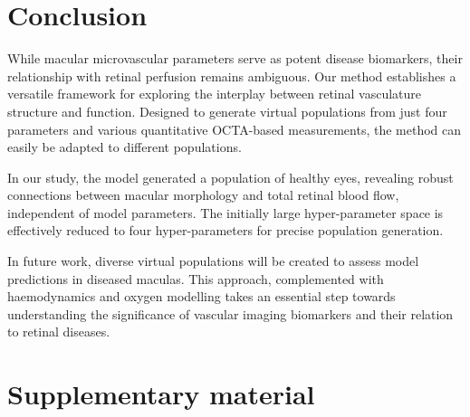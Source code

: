 \documentclass[11pt,]{article}
\newcommand{\supplementarysection}{%
  \setcounter{figure}{0}%
  \setcounter{table}{0}
  \let\oldthefigure\thefigure%
  \let\oldthetable\thetable
  \renewcommand{\thefigure}{S\oldthefigure}%
  \renewcommand{\thetable}{S\oldthetable}
  \section{Supplementary material}%
  \let\oldsection\section%
  \renewcommand{\section}{%
    \let\thefigure\oldthefigure%
    \let\section\oldsection%
    \oldsection%
  }
}
\begin{document}
\section{Conclusion}\label{sec:conclusion}

While macular microvascular parameters serve as potent disease biomarkers, their relationship with retinal perfusion remains ambiguous.
Our method establishes a versatile framework for exploring the interplay between retinal vasculature structure and function.
Designed to generate virtual populations from just four parameters and various quantitative OCTA-based measurements, the method can easily be adapted to different populations.

In our study, the model generated a population of healthy eyes, revealing robust connections between macular morphology and total retinal blood flow, independent of model parameters.
The initially large hyper-parameter space is effectively reduced to four hyper-parameters for precise population generation.

In future work, diverse virtual populations will be created to assess model predictions in diseased maculas.
This approach, complemented with haemodynamics and oxygen modelling takes an essential step towards understanding the significance of vascular imaging biomarkers and their relation to retinal diseases.



\supplementarysection
\end{document}
